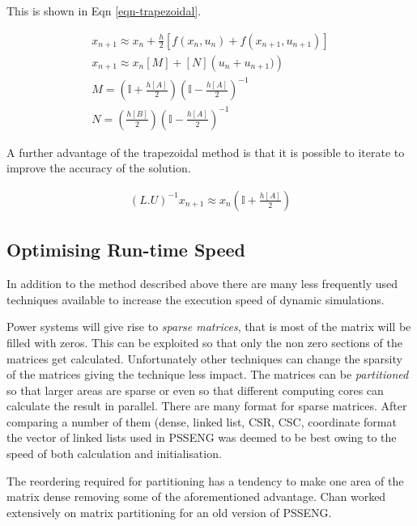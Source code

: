 \documentclass[a4paper,oneside,12pt]{report}
\begin{document}
This is shown in Eqn \ref{eqn-trapezoidal}.

\begin{eqnarray}
x_{n+1} \approx x_{n} + \frac{h}{2} \left[ f( x_n, u_n ) +  f( x_{n+1}, u_{n+1} ) \right] \label{eqn-trapezoidal}\\
x_{n+1} \approx x_{n} [M] + [N] \left( u_n + u_{n+1} ) \right) \label{eqn-trapezoidal-linear}\\
M = \left( \mathbb{I} + \frac{h[A]}{2} \right) \left( \mathbb{I} - \frac{h[A]}{2} \right)^{-1}\\
N = \left(\frac{h[B]}{2} \right) \left( \mathbb{I} - \frac{h[A]}{2} \right)^{-1}
\end{eqnarray}

A further advantage of the trapezoidal method is that it is possible to iterate to improve the accuracy of the solution.

\begin{eqnarray}
(L.U)^{-1} x_{n+1} \approx x_{n} \left( \mathbb{I} + \frac{h[A]}{2} \right)
\end{eqnarray}

\subsection{Optimising Run-time Speed}

In addition to the method described above there are many less frequently used techniques available to increase the execution speed of dynamic simulations.

Power systems will give rise to \emph{sparse matrices}, that is most of the matrix will be filled with zeros. This can be exploited so that only the non zero sections of the matrices get calculated. Unfortunately other techniques can change the sparsity of the matrices giving the technique less impact. The matrices can be \emph{partitioned} so that larger areas are sparse or even so that different computing cores can calculate the result in parallel. There are many format for sparse matrices. After comparing a number of them (dense, linked list, CSR, CSC, coordinate format \cite{Saad1992} the vector of linked lists used in PSSENG was deemed to be best owing to the speed of both calculation and initialisation.

The reordering required for partitioning has a tendency to make one area of the matrix dense removing some of the aforementioned advantage. Chan \cite{Chan1992} worked extensively on matrix partitioning for an old version of PSSENG.
\end{document}
